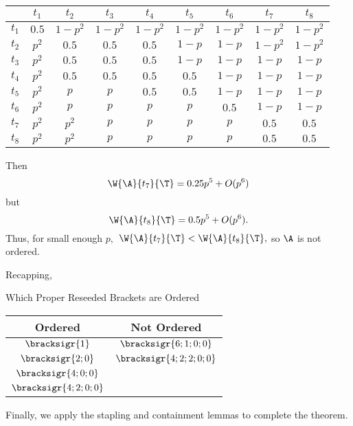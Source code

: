 {{    \begin{center}
        \begin{tabular}{c | c c c c c c c c}
        & $t_1$ & $t_2$ & $t_3$ & $t_4$ & $t_5$ & $t_6$ & $t_7$ & $t_8$\\ 
        \hline
        $t_1$ & $0.5$ & $1-p^2$ & $1-p^2$ & $1-p^2$ & $1-p^2$& $1-p^2$& $1-p^2$& $1-p^2$\\
        $t_2$ & $p^2$ & $0.5$ & $0.5$ & $0.5$ & $1-p$ & $1-p$& $1-p^2$& $1-p^2$\\
        $t_3$ & $p^2$ & $0.5$ & $0.5$ & $0.5$ & $1-p$ & $1-p$ & $1-p$& $1-p$\\
        $t_4$ & $p^2$ & $0.5$ & $0.5$ & $0.5$ & $0.5$ & $1-p$ & $1-p$ & $1-p$\\
        $t_5$ & $p^2$ & $p$ & $p$ & $0.5$ & $0.5$ & $1-p$ & $1-p$ & $1-p$\\
        $t_6$ & $p^2$ & $p$ & $p$ & $p$ & $p$ & $0.5$ & $1-p$ & $1-p$\\
        $t_7$ & $p^2$ & $p^2$ & $p$ & $p$ & $p$ & $p$ & $0.5$ & $0.5$\\
        $t_8$ & $p^2$ & $p^2$ & $p$ & $p$ & $p$ & $p$ & $0.5$ & $0.5$\\
        \end{tabular}
    \end{center}

    Then 
        $$\W{\A}{t_7}{\T} = 0.25p^5 + O(p^6)$$
    but
        $$\W{\A}{t_8}{\T} = 0.5p^5 + O(p^6).$$
    Thus, for small enough $p,$ $\W{\A}{t_7}{\T} < \W{\A}{t_8}{\T},$ so $\A$ is not ordered.
}{}

Recapping,

\begin{figg}{Which Proper Reseeded Brackets are Ordered}{}
    \begin{center}
        \begin{tabular}{ c | c }
            Ordered & Not Ordered\\
            \hline
            $\bracksigr{1}$ & $\bracksigr{6;1;0;0}$\\
            $\bracksigr{2;0}$ & $\bracksigr{4;2;2;0;0}$\\
            $\bracksigr{4;0;0}$ & \\
            $\bracksigr{4;2;0;0}$ & \\
        \end{tabular}
    \end{center}
\end{figg} 

Finally, we apply the stapling and containment lemmas to complete the theorem.

}
